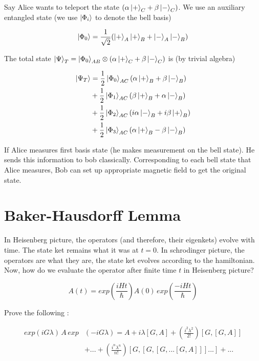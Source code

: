 \documentclass{report}
\begin{document}
\noindent Say Alice wants to teleport the state $(\alpha\ket{+}_C+\beta\ket{-}_C)$. We use an auxiliary entangled state (we use ${\ket{\Phi_i}}$ to denote the bell basis)

$$\ket{\Phi_0} = \frac{1}{\sqrt{2}}(\ket{+}_A \ket{+}_B + \ket{-}_A\ket{-}_B)$$

\noindent The total state $\ket{\Psi}_{T} = \ket{\Phi_0}_{AB}\otimes (\alpha\ket{+}_C+\beta\ket{-}_C)$ is (by trivial algebra)

\begin{align}
  \ket{\Psi_T} &= \frac{1}{2}\ket{\Phi_0}_{AC}(\alpha\ket{+}_B + \beta\ket{-}_{B})\\
                                   & + \frac{1}{2}\ket{\Phi_1}_{AC}(\beta\ket{+}_B + \alpha\ket{-}_{B})\nonumber\\
                                   & + \frac{1}{2}\ket{\Phi_2}_{AC}(i\alpha\ket{-}_B + i\beta\ket{+}_{B})\nonumber\\
                                   & + \frac{1}{2}\ket{\Phi_3}_{AC}(\alpha\ket{+}_B - \beta\ket{-}_{B})\nonumber
\end{align}

\noindent If Alice measures first basis state (he makes measurement on the bell state). He sends this information to bob classically. Corresponding to each bell state that Alice measures, Bob can set up appropriate magnetic field to get the original state.

\section{Baker-Hausdorff Lemma}

In Heisenberg picture, the operators (and therefore, their eigenkets) evolve with time. The state ket remains what it was at $t=0$. In schrodinger picture, the operators are what they are, the state ket evolves according to the hamiltonian. Now, how do we evaluate the operator after finite time $t$ in Heisenberg picture?

$$A(t) = exp\left(\frac{iHt}{\hbar}\right)A(0)\,exp\left(\frac{-iHt}{\hbar}\right)$$

Prove the following :

\begin{align}
  exp(iG\lambda)\,A\,exp&(-iG\lambda) = A + i\lambda[G,A] + \left(\frac{i^2\lambda^2}{2!}\right)[G,[G,A]]\\
                    & +...+\left(\frac{i^n\lambda^n}{n!}\right)[G,[G,[G,...[G,A]]]...]+...\nonumber
\end{align}
\end{document}
